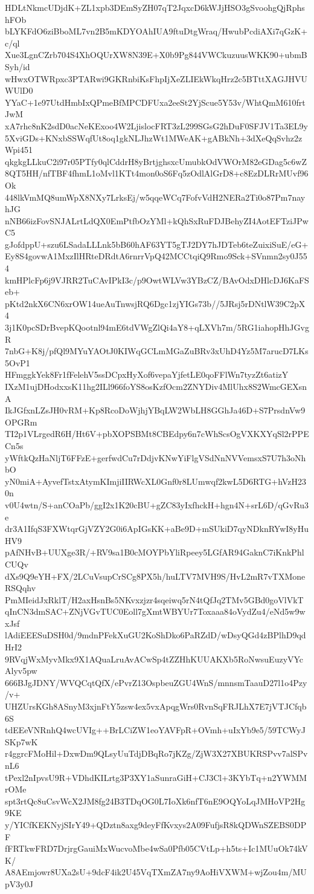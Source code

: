 HDLtNkmcUDjdK+ZL1xpb3DEmSyZH07qT2JqxcD6kWJjHSO3gSvoohgQjRphshFOb
bLYKFdO6ziBboML7vn2B5mKDYOAhIUA9ftuDtgWraq/HwubPcdiAXi7qGzK+c/ql
Xue3LgnCZrb704S4XhOQUrXW8N39E+X0b9Pg844VWCkuzuusWKK90+ubmBSyh/id
wHwxOTWRpxc3PTARwi9GKRnbiKsFhpIjXeZLIEkWkqHrz2c5BTttXAGJHVUWUlD0
YYaC+1e97UtdHmbIxQPmeBfMPCDFUxa2eeSt2YjScue5Y53v/WhtQmM610frtJwM
xA7rhc8nK2sdD0acNeKExoo4W2LjislocFRT3zL299SGsG2hDuF0SFJV1Ta3EL9y
5XviGDs+KNxbSSWqfUt8oq1gkNLJhzWt1MWeAK+gABkNh+3dXeQqSvhz2zWpi451
qkgkgLLkuC2i97r05PTfy0qlCddrH8yBrtjghsxcUmubkOdVWOrM82eGDag5c6wZ
8QT5HH/nfTBF4fhmL1oMvl1KTt4mon0oS6Fq5zOdlAlGrD8+c8EzDLRrMUvf96Ok
448lkVmMQ8umWpX8NXy7LrksEj/w5qqeWCq7FofvVdH2NERa2Ti0o87Pm7nayhJG
nNB66izFovSNJALrtLdQX0EmPtfbOzYMl+kQhSxRuFDJBehyZI4AotEFTziJPwC5
gJofdppU+szu6LSadaLLLnk5bB60hAF63YT5gTJ2DY7hJDTeb6teZuixiSuE/eG+
Ey8S4govwA1MxzIlHRteDRdtA6rnrrVpQ42MCCtqiQ9Rmo9Sck+SVnmn2sy0J554
kmHPlcFp6j9VJRR2TuCAvIPkI3c/p9OwtWLVw3YBzCZ/BAvOdxDHlcDJ6KaFSeb+
pKtd2nkX6CN6xrOW14ueAuTnwsjRQ6Dgc1zjYIGs73b//5JRsj5rDNtlW39C2pX4
3j1K0pcSDrBvepKQootnl94mE6tdVWgZlQi4aY8+qLXVh7m/5RG1iahopHhJGvgR
7nbG+K8j/pfQl9MYuYAOtJ0KIWqGCLmMGaZuBRv3xUhD4Yz5M7arucD7LKs5OvP1
HFmggkYek8Fr1fFelehV5ssDCpxHyXof6vepaYjfetLE0qoFFlWn7tyzZt6atizY
IXzM1ujDHodxxsK11hg2ILl966foYS8osKzfOcm2ZNYDiv4MlUhx8S2WmcGEXsnA
IkJGfxnLZsJH0vRM+Kp8RcoDoWjhjYBqLW2WbLH8GGhJa46D+S7PrsdnVw9OPGRm
TI2p1VLrgedR6H/Ht6V+pbXOPSBMt8CBEdpy6n7cWhScsOgVXKXYqSl2rPPECn5s
yWftkQzHaNljT6FFzE+gerfwdCu7rDdjvKNwYiFlgVSdNnNVVemsxS7U7h3oNhbO
yN0miA+AyvefTstxAtymKImjiIIRWcXL0Gnf0r8LUmwqf2kwL5D6RTG+hVzH230n
v0U4wtn/S+anCOaPb/ggI2x1K20cBU+gZC83yIxfhckH+hgn4N+srL6D/qGvRu3e
dr3A1IfqS3FXWtqrGjVZY2G0i6ApIGsKK+aBe9D+mSUkiD7qyNDknRYwI8yHuHV9
pAfNHvB+UUXge3R/+RV9sa1B0cMOYPbYliRpeey5LGfAR94GaknC7iKnkPhlCUQv
dXs9Q9eYH+FX/2LCuVsupCrSCg8PX5h/huLTV7MVH9S/HvL2mR7vTXMoneRSQqhv
PmMIeidJxRklT/H2axHsnBs5NKvxzjzr4sqeiwq5rN4tQfJq2TMv5GBd0goVlVkT
qInCN3dmSAC+ZNjVGvTUC0Eoll7gXmtWBYUr7Toxaaa84oVydZu4/eNd5w9wxJsf
lAdiEEESuDSH0d/9mdnPFekXuGU2KoShDko6PaRZdD/wDsyQGd4zBPlhD9qdHrI2
9RVqjWxMyvMkx9X1AQuaLruAvACwSp4tZZHhKUUAKXb5RoNwsuEuzyVYcAlyv5pw
666BJgJDNY/WVQCqtQfX/ePvrZ13OspbeuZGU4WnS/mnnsmTaauD27l1o4Pzy/v+
UHZUrsKGh8ASnyM3xjnFtY5zsw4ex5vxApqgWrs0RvnSqFRJLhX7E7jVTJCfqb6S
tdEEeVNRnhQ4wcUVIg++BrLCiZW1eoYAVFpR+OVmh+uIxYb9e5/59TCWyJSKp7wK
r4ggrcFMoHil+DxwDm9QLsyUuTdjDBqRo7jKZg/ZjW3X27XBUKRSPvv7alSPvnL6
tPexl2nIpvsU9R+VDhdKILrtg3P3XY1aSunraGiH+CJ3Cl+3KYbTq+n2YWMMrOMe
spt3rtQc8uCsvWcX2JM8fg24B3TDqOG0L7IoXk6nfT6nE9OQYoLqJMHoVP2Hg9KE
y/YICfKEKNyjSIrY49+QDztn8axg9deyFfKvxys2A09FufjsR8kQDWnSZEBS0DPF
fFRTkwFRD7DrjrgGauiMxWucvoMbe4wSa0Pfb05CVtLp+h5ts+Ic1MUuOk74kVK/
A8AEmjowr8UXa2sU+9dcF4ik2U45VqTXmZA7ny9AoHiVXWM+wjZou4m/MUpV3y0J
